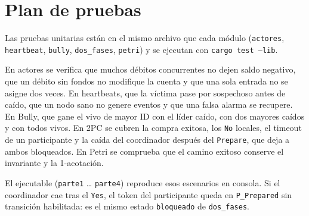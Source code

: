 \section{Plan de pruebas}

Las pruebas unitarias están en el mismo archivo que cada módulo
(\texttt{actores}, \texttt{heartbeat}, \texttt{bully},
\texttt{dos\_fases}, \texttt{petri}) y se ejecutan con
\texttt{cargo test --lib}.

En actores se verifica que muchos débitos concurrentes no dejen saldo
negativo, que un débito sin fondos no modifique la cuenta y que una sola
entrada no se asigne dos veces. En heartbeats, que la víctima pase por
sospechoso antes de caído, que un nodo sano no genere eventos y que una
falsa alarma se recupere. En Bully, que gane el vivo de mayor ID con el
líder caído, con dos mayores caídos y con todos vivos. En 2PC se cubren
la compra exitosa, los \texttt{No} locales, el timeout de un
participante y la caída del coordinador después del \texttt{Prepare},
que deja a ambos bloqueados. En Petri se comprueba que el camino
exitoso conserve el invariante y la 1-acotación.

El ejecutable (\texttt{parte1} \ldots{} \texttt{parte4}) reproduce esos
escenarios en consola. Si el coordinador cae tras el \texttt{Yes}, el
token del participante queda en \texttt{P\_Prepared} sin transición
habilitada: es el mismo estado \texttt{bloqueado} de
\texttt{dos\_fases}.
